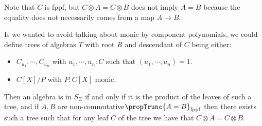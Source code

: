 \begin{remark}
Note that $C$ is fppf, but $C\otimes A=C\otimes B$ does not imply $A=B$ because the equality does not necessarily comes from a map $A\to B$.
\end{remark}

\begin{remark}
Is we wanted to avoid talking about monic by component polynomials, we could define trees of algebras $T$ with root $R$ and descendant of $C$ being either:
\begin{itemize} 
\item $C_{u_1},\cdots,C_{u_n}$ with $u_1,\cdots,u_n:C$ such that $(u_1,\cdots,u_n) = 1$.
\item $C[X]/P$ with $P:C[X]$ monic.
\end{itemize}
Then an algebra is in $S_\Sigma$ if and only if it is the product of the leaves of such a tree, and if $A,B$ are non-commutative$\propTrunc{A=B}_{\mathrm{fppf}}$ then there exists such a tree such that for any leaf $C$ of the tree we have that $C\otimes A = C\otimes B$.
\end{remark}



